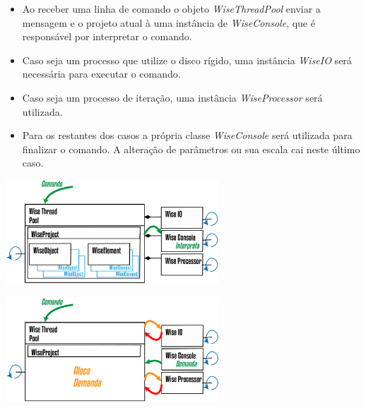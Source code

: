 \documentclass[10pt,aspectratio=169]{beamer}
\theoremstyle{remark}
\theoremstyle{definition}
\begin{document}
\begin{frame}[allowframebreaks]
\begin{center}
	\end{center}
	
	\framebreak

	\begin{itemize}
		\item Ao receber uma linha de comando o objeto \textit{WiseThreadPool} enviar a mensagem e o projeto atual à uma instância de \textit{WiseConsole}, que é responsável por interpretar o comando.
		\item Caso seja um processo que utilize o disco rígido, uma instância \textit{WiseIO} será necessária para executar o comando. 
		\item Caso seja um processo de iteração, uma instância \textit{WiseProcessor} será utilizada.
		\item Para os restantes dos casos a própria classe \textit{WiseConsole} será utilizada para finalizar o comando. A alteração de parâmetros ou sua escala cai neste último caso.
	\end{itemize}		
	
	\begin{center}
		
		\item \includegraphics[width=0.6\textwidth]{Figures/WiseThreaPoolCMD@16x.png}
		
	\end{center}
	
	\framebreak
	\begin{center}
		
		\item \includegraphics[width=0.6\textwidth]{Figures/WiseThreaPoolCMDSub@16x.png}
		
	\end{center}
	

\end{frame}
\end{document}
